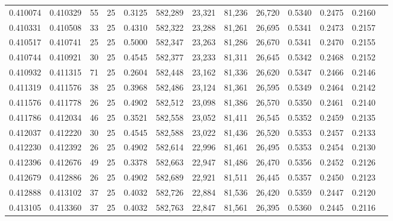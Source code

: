 \begin{tabular}{rrrrrrrrrrrrr}
0.410074 & 0.410329 &    55 &  25 &                                     0.3125 & 582,289 &  23,321 &  81,236 &  26,720 & 0.5340 & 0.2475 & 0.2160 \\
0.410331 & 0.410508 &    33 &  25 &                                     0.4310 & 582,322 &  23,288 &  81,261 &  26,695 & 0.5341 & 0.2473 & 0.2157 \\
0.410517 & 0.410741 &    25 &  25 &                                     0.5000 & 582,347 &  23,263 &  81,286 &  26,670 & 0.5341 & 0.2470 & 0.2155 \\
0.410744 & 0.410921 &    30 &  25 &                                     0.4545 & 582,377 &  23,233 &  81,311 &  26,645 & 0.5342 & 0.2468 & 0.2152 \\
0.410932 & 0.411315 &    71 &  25 &                                     0.2604 & 582,448 &  23,162 &  81,336 &  26,620 & 0.5347 & 0.2466 & 0.2146 \\
0.411319 & 0.411576 &    38 &  25 &                                     0.3968 & 582,486 &  23,124 &  81,361 &  26,595 & 0.5349 & 0.2464 & 0.2142 \\
0.411576 & 0.411778 &    26 &  25 &                                     0.4902 & 582,512 &  23,098 &  81,386 &  26,570 & 0.5350 & 0.2461 & 0.2140 \\
0.411786 & 0.412034 &    46 &  25 &                                     0.3521 & 582,558 &  23,052 &  81,411 &  26,545 & 0.5352 & 0.2459 & 0.2135 \\
0.412037 & 0.412220 &    30 &  25 &                                     0.4545 & 582,588 &  23,022 &  81,436 &  26,520 & 0.5353 & 0.2457 & 0.2133 \\
0.412230 & 0.412392 &    26 &  25 &                                     0.4902 & 582,614 &  22,996 &  81,461 &  26,495 & 0.5353 & 0.2454 & 0.2130 \\
0.412396 & 0.412676 &    49 &  25 &                                     0.3378 & 582,663 &  22,947 &  81,486 &  26,470 & 0.5356 & 0.2452 & 0.2126 \\
0.412679 & 0.412886 &    26 &  25 &                                     0.4902 & 582,689 &  22,921 &  81,511 &  26,445 & 0.5357 & 0.2450 & 0.2123 \\
0.412888 & 0.413102 &    37 &  25 &                                     0.4032 & 582,726 &  22,884 &  81,536 &  26,420 & 0.5359 & 0.2447 & 0.2120 \\
0.413105 & 0.413360 &    37 &  25 &                                     0.4032 & 582,763 &  22,847 &  81,561 &  26,395 & 0.5360 & 0.2445 & 0.2116 \\

\end{tabular}

